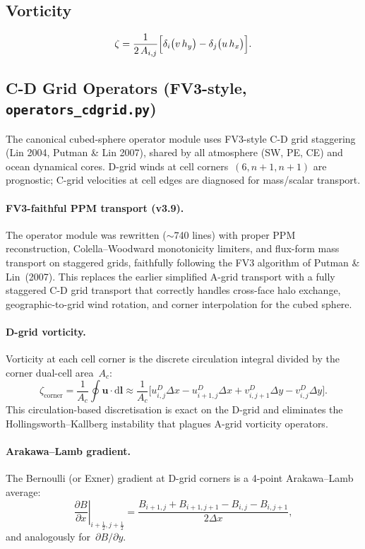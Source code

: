 \documentclass[11pt,a4paper]{article}
\newcommand{\dd}{\mathrm{d}}
\newcommand{\pp}{\partial}
\newcommand{\half}{\tfrac{1}{2}}
\begin{document}
\subsection{Vorticity}
\begin{equation}
  \zeta = \frac{1}{2\,A_{i,j}}
  \Bigl[\delta_i\bigl(v\,h_y\bigr)-\delta_j\bigl(u\,h_x\bigr)\Bigr].
\end{equation}

\subsection{C-D Grid Operators (FV3-style, \texttt{operators\_cdgrid.py})}

The canonical cubed-sphere operator module uses FV3-style C-D grid staggering (Lin 2004, Putman \& Lin 2007), shared by all atmosphere (SW, PE, CE) and ocean dynamical cores.  D-grid winds at cell corners~$(6,n\!+\!1,n\!+\!1)$ are prognostic; C-grid velocities at cell edges are diagnosed for mass/scalar transport.

\paragraph{FV3-faithful PPM transport (v3.9).}
The operator module was rewritten (${\sim}$740 lines) with proper PPM reconstruction, Colella--Woodward monotonicity limiters, and flux-form mass transport on staggered grids, faithfully following the FV3 algorithm of Putman \& Lin~(2007).  This replaces the earlier simplified A-grid transport with a fully staggered C-D grid transport that correctly handles cross-face halo exchange, geographic-to-grid wind rotation, and corner interpolation for the cubed sphere.

\paragraph{D-grid vorticity.}
Vorticity at each cell corner is the discrete circulation integral divided by the corner dual-cell area~$A_c$:
\begin{equation}
  \zeta_{\mathrm{corner}} = \frac{1}{A_c}\oint \bm{u}\cdot\dd\bm{l}
  \approx \frac{1}{A_c}\bigl[u^D_{i,j}\Delta x - u^D_{i+1,j}\Delta x + v^D_{i,j+1}\Delta y - v^D_{i,j}\Delta y\bigr].
\end{equation}
This circulation-based discretisation is exact on the D-grid and eliminates the Hollingsworth--Kallberg instability that plagues A-grid vorticity operators.

\paragraph{Arakawa--Lamb gradient.}
The Bernoulli (or Exner) gradient at D-grid corners is a 4-point Arakawa--Lamb average:
\begin{equation}
  \left.\frac{\pp B}{\pp x}\right|_{i+\half,j+\half}
  = \frac{B_{i+1,j}+B_{i+1,j+1}-B_{i,j}-B_{i,j+1}}{2\Delta x},
\end{equation}
and analogously for~$\pp B/\pp y$.
\end{document}
